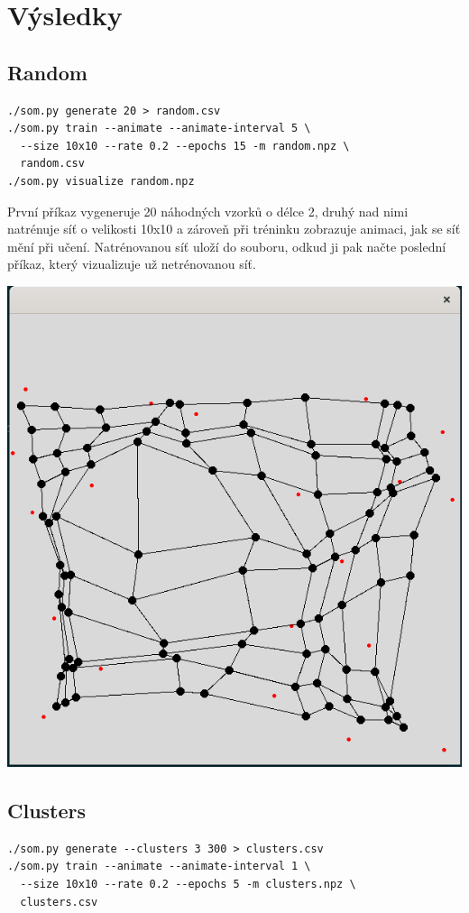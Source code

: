 \documentclass[11pt]{article}
\begin{document}
\newpage

\section{Výsledky}
\label{sec:org697099a}

\subsection{Random}
\label{sec:org7730a1c}
\begin{verbatim}
./som.py generate 20 > random.csv
./som.py train --animate --animate-interval 5 \
  --size 10x10 --rate 0.2 --epochs 15 -m random.npz \
  random.csv
./som.py visualize random.npz
\end{verbatim}

První příkaz vygeneruje 20 náhodných vzorků o délce 2, druhý nad nimi natrénuje
síť o velikosti 10x10 a zároveň při tréninku zobrazuje animaci, jak se síť mění
při učení. Natrénovanou síť uloží do souboru, odkud ji pak načte poslední
příkaz, který vizualizuje už netrénovanou síť.

\begin{center}
\includegraphics[width=.7\linewidth]{img/Screenshot from 2019-12-19 11-27-05.png}
\end{center}

\subsection{Clusters}
\label{sec:org70edf6b}
\begin{verbatim}
./som.py generate --clusters 3 300 > clusters.csv
./som.py train --animate --animate-interval 1 \
  --size 10x10 --rate 0.2 --epochs 5 -m clusters.npz \
  clusters.csv
\end{verbatim}
\end{document}
